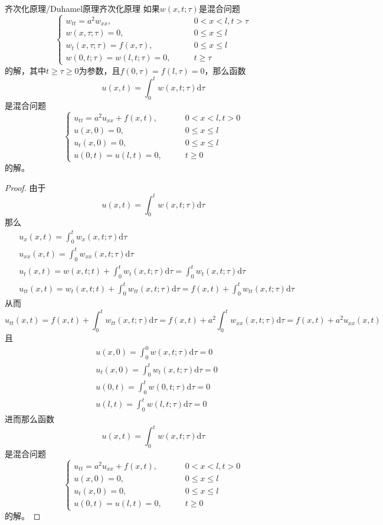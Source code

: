 \documentclass[lang = cn, scheme = chinese, thmcnt = section]{elegantbook}
\newcommand{\dd}{\mathrm{d}}           %
\begin{document}
\begin{theorem}{齐次化原理/Duhamel原理}{齐次化原理}
	如果$w(x,t;\tau)$是混合问题
	$$
	\begin{cases}
		w_{tt}=a^2w_{xx},\qquad & 0<x<l,t> \tau\\
		w(x,\tau;\tau)=0,\qquad & 0\le x \le l\\
		w_t(x,\tau;\tau)=f(x,\tau),\qquad & 0\le x \le l\\
		w(0,t;\tau)=w(l,t;\tau)=0,\qquad & t\ge \tau
	\end{cases}
	$$
	的解，其中$t\ge \tau\ge 0$为参数，且$f(0,\tau)=f(l,\tau)=0$，那么函数
	$$
	u(x,t)=\int_{0}^{t}w(x,t;\tau)\dd \tau
	$$
	是混合问题
	$$
	\begin{cases}
		u_{tt}=a^2u_{xx}+f(x,t),\qquad & 0<x<l,t>0\\
		u(x,0)=0,\qquad & 0\le x \le l\\
		u_t(x,0)=0,\qquad & 0\le x \le l\\
		u(0,t)=u(l,t)=0,\qquad & t\ge 0
	\end{cases}
	$$
	的解。
\end{theorem}

\begin{proof}
	由于
	$$
	u(x,t)=\int_{0}^{t}w(x,t;\tau)\dd \tau
	$$
	那么
	\begin{align*}
		& u_x(x,t)=\int_{0}^{t}w_x(x,t;\tau)\dd \tau\\
		& u_{xx}(x,t)=\int_{0}^{t}w_{xx}(x,t;\tau)\dd \tau\\
		& u_t(x,t)=w(x,t;t)+\int_{0}^{t}w_t(x,t;\tau)\dd \tau=\int_{0}^{t}w_t(x,t;\tau)\dd \tau\\
		& u_{tt}(x,t)=w_t(x,t;t)+\int_{0}^{t}w_{tt}(x,t;\tau)\dd \tau=f(x,t)+\int_{0}^{t}w_{tt}(x,t;\tau)\dd \tau
	\end{align*}
	从而%
	$$
	u_{tt}(x,t)=f(x,t)+\int_{0}^{t}w_{tt}(x,t;\tau)\dd \tau
	=f(x,t)+a^2\int_{0}^{t}w_{xx}(x,t;\tau)\dd \tau
	=f(x,t)+a^2u_{xx}(x,t)
	$$
	且
	\begin{align*}
		& u(x,0)=\int_0^0 w(x,t;\tau)\dd \tau=0\\
		& u_t(x,0)=\int_{0}^{t}w_t(x,t;\tau)\dd \tau=0\\
		& u(0,t)=\int_{0}^{t}w(0,t;\tau)\dd \tau=0\\
		& u(l,t)=\int_{0}^{t}w(l,t;\tau)\dd \tau=0
	\end{align*}
	进而那么函数
	$$
	u(x,t)=\int_{0}^{t}w(x,t;\tau)\dd \tau
	$$
	是混合问题
	$$
	\begin{cases}
		u_{tt}=a^2u_{xx}+f(x,t),\qquad & 0<x<l,t>0\\
		u(x,0)=0,\qquad & 0\le x \le l\\
		u_t(x,0)=0,\qquad & 0\le x \le l\\
		u(0,t)=u(l,t)=0,\qquad & t\ge 0
	\end{cases}
	$$
	的解。
\end{proof}
\end{document}
